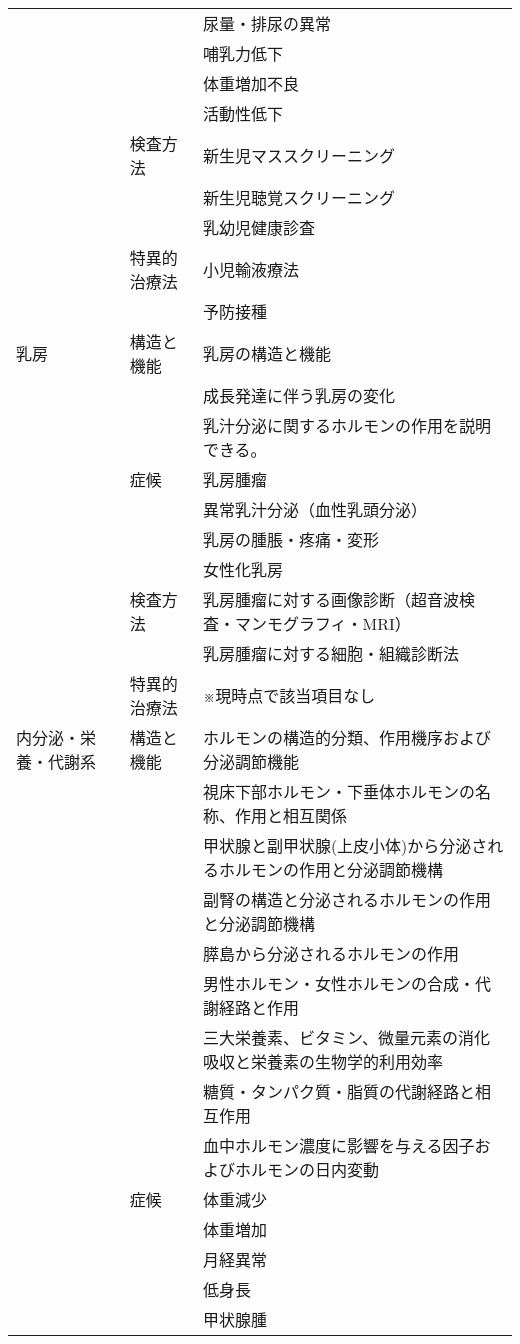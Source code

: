 \begin{xltabular}{\linewidth}{XXX}
 &  & 尿量・排尿の異常 \\
 &  & 哺乳力低下 \\
 &  & 体重増加不良 \\
 &  & 活動性低下 \\
 & 検査方法 & 新生児マススクリーニング \\
 &  & 新生児聴覚スクリーニング \\
 &  & 乳幼児健康診査 \\
 & 特異的治療法 & 小児輸液療法 \\
 &  & 予防接種 \\
乳房 & 構造と機能 & 乳房の構造と機能 \\
 &  & 成長発達に伴う乳房の変化 \\
 &  & 乳汁分泌に関するホルモンの作用を説明できる。 \\
 & 症候 & 乳房腫瘤 \\
 &  & 異常乳汁分泌（血性乳頭分泌） \\
 &  & 乳房の腫脹・疼痛・変形 \\
 &  & 女性化乳房 \\
 & 検査方法 & 乳房腫瘤に対する画像診断（超音波検査・マンモグラフィ・MRI） \\
 &  & 乳房腫瘤に対する細胞・組織診断法 \\
 & 特異的治療法 & ※現時点で該当項目なし \\
内分泌・栄養・代謝系 & 構造と機能 & ホルモンの構造的分類、作用機序および分泌調節機能 \\
 &  & 視床下部ホルモン・下垂体ホルモンの名称、作用と相互関係 \\
 &  & 甲状腺と副甲状腺(上皮小体)から分泌されるホルモンの作用と分泌調節機構 \\
 &  & 副腎の構造と分泌されるホルモンの作用と分泌調節機構 \\
 &  & 膵島から分泌されるホルモンの作用 \\
 &  & 男性ホルモン・女性ホルモンの合成・代謝経路と作用 \\
 &  & 三大栄養素、ビタミン、微量元素の消化吸収と栄養素の生物学的利用効率 \\
 &  & 糖質・タンパク質・脂質の代謝経路と相互作用 \\
 &  & 血中ホルモン濃度に影響を与える因子およびホルモンの日内変動 \\
 & 症候 & 体重減少 \\
 &  & 体重増加 \\
 &  & 月経異常 \\
 &  & 低身長 \\
 &  & 甲状腺腫 \\

\end{xltabular}
